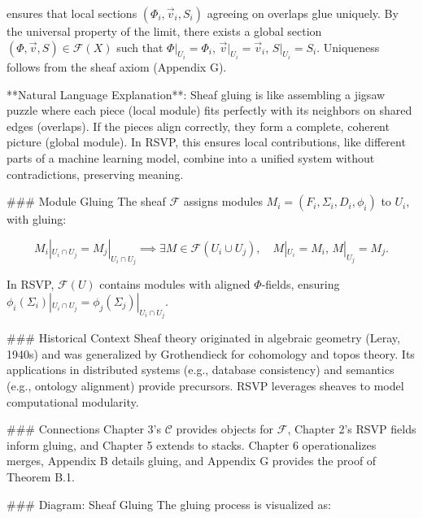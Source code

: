 \documentclass[12pt]{article}
\begin{document}
{ensures that local sections $(\Phi_i, \vec{v}_i, S_i)$ agreeing on overlaps glue uniquely. By the universal property of the limit, there exists a global section $(\Phi, \vec{v}, S) \in \mathcal{F}(X)$ such that $\Phi|_{U_i} = \Phi_i$, $\vec{v}|_{U_i} = \vec{v}_i$, $S|_{U_i} = S_i$. Uniqueness follows from the sheaf axiom \cite{mac2013categories} (Appendix G).

**Natural Language Explanation**: Sheaf gluing is like assembling a jigsaw puzzle where each piece (local module) fits perfectly with its neighbors on shared edges (overlaps). If the pieces align correctly, they form a complete, coherent picture (global module). In RSVP, this ensures local contributions, like different parts of a machine learning model, combine into a unified system without contradictions, preserving meaning.

### Module Gluing
The sheaf $\mathcal{F}$ assigns modules $M_i = (F_i, \Sigma_i, D_i, \phi_i)$ to $U_i$, with gluing:

\[
M_i|_{U_i \cap U_j} = M_j|_{U_i \cap U_j} \implies \exists M \in \mathcal{F}(U_i \cup U_j), \quad M|_{U_i} = M_i, \, M|_{U_j} = M_j.
\]

In RSVP, $\mathcal{F}(U)$ contains modules with aligned $\Phi$-fields, ensuring $\phi_i(\Sigma_i)|_{U_i \cap U_j} = \phi_j(\Sigma_j)|_{U_i \cap U_j}$.

### Historical Context
Sheaf theory originated in algebraic geometry (Leray, 1940s) and was generalized by Grothendieck for cohomology and topos theory. Its applications in distributed systems (e.g., database consistency) and semantics (e.g., ontology alignment) provide precursors. RSVP leverages sheaves to model computational modularity.

### Connections
Chapter 3’s $\mathcal{C}$ provides objects for $\mathcal{F}$, Chapter 2’s RSVP fields inform gluing, and Chapter 5 extends to stacks. Chapter 6 operationalizes merges, Appendix B details gluing, and Appendix G provides the proof of Theorem B.1.

### Diagram: Sheaf Gluing
The gluing process is visualized as:

\begin{center}
\end{center}

}
\end{document}

